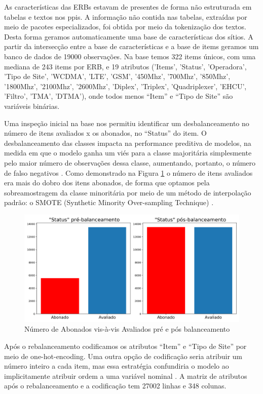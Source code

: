 \documentclass[
	12pt,				%
	openany,			%
	oneside,			%
	a4paper,			%
	english,			%
	french,				%
	spanish,			%
	brazil,				%
	]{abntex2}
\begin{document}
As características das ERBs estavam de presentes de forma não estruturada em
tabelas e textos nos ppis. A informação não contida nas tabelas, extraídas por
meio de pacotes especializados, foi obtida por meio da tokenização dos textos.
Desta forma geramos automaticamente uma base de características dos sítios. A
partir da intersecção entre a base de características e a base de items geramos
um banco de dados de 19000 observações. Na base temos 322 items únicos, com uma
mediana de 243 items por ERB, e 19 atributos ('Items', 'Status', 'Operadora',
'Tipo de Site', 'WCDMA', 'LTE', 'GSM', '450Mhz', '700Mhz', '850Mhz', '1800Mhz',
'2100Mhz', '2600Mhz', 'Diplex', 'Triplex', 'Quadriplexer', 'EHCU', 'Filtro',
'TMA', 'DTMA'), onde todos menos ``Item'' e ``Tipo de Site'' são variáveis
binárias.

Uma inspeção inicial na base nos permitiu identificar um desbalanceamento no
número de itens avaliados x os abonados, no ``Status'' do item. O
desbalanceamento das classes impacta na performance preditiva de modelos, na
medida em que o modelo ganha um viés para a classe majoritária simplesmente pelo
maior número de observações dessa classe, aumentando, portanto, o número de
falso negativos \cite{faceli2011inteligencia}. Como demonstrado na Figura
\ref{ref:figbal} o número de itens avaliados era mais do dobro dos itens
abonados, de forma que optamos pela sobreamostragem da classe minoritária por
meio de um método de interpolação padrão: o SMOTE (Synthetic Minority
Over-sampling Technique) \cite{chawla2002smote}. 

\begin{figure}[h]
  \includegraphics[scale=0.5]{img/balanceamento.png}
  \caption{Número de Abonados vis-à-vis Avaliados pré e pós balanceamento}
  \label{ref:figbal}
\end{figure}

Após o rebalanceamento codificamos os atributos ``Item'' e ``Tipo de Site'' por
meio de one-hot-encoding. Uma outra opção de codificação seria atribuir um
número inteiro a cada item, mas essa estratégia confundiria o modelo ao
implicitamente atribuir ordem a uma variável nominal
\cite{faceli2011inteligencia}. A matriz de atributos após o rebalanceamento e a
codifica\c{c}ão tem 27002 linhas e 348 colunas.
\end{document}

